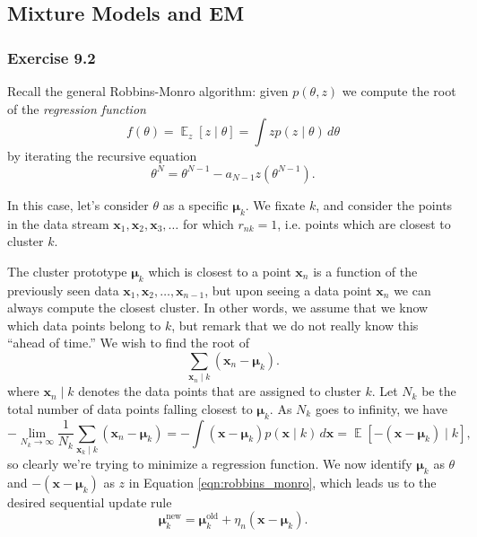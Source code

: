 \documentclass[12pt, a4paper]{article}
\newcommand{\vect}[1]{\bm{#1}}
\DeclareMathOperator{\E}{\mathbb{E}}
\begin{document}
\subsection{Mixture Models and EM}

\subsubsection*{Exercise 9.2}
Recall the general Robbins-Monro algorithm:
given $p(\theta, z)$ we compute the root of
the \emph{regression function}
\begin{equation*}
	f(\theta) = \E_z \left[ z \mid \theta \right]
	= \int z p (z \mid \theta) \, d\theta
\end{equation*}
by iterating the recursive equation
\begin{equation}
\label{eqn:robbins_monro}
	\theta^{N} = \theta^{N-1} - a_{N-1} z \left( \theta^{N-1} \right).
\end{equation}

In this case, let's consider $\theta$ as a specific $\vect{\mu}_k$.
We fixate $k$, and consider the points in the data stream $\vect{x}_1, \vect{x}_2, \vect{x}_3, \ldots$ for which $r_{nk} = 1$, i.e. points which are closest to cluster $k$.

The cluster prototype $\vect{\mu}_k$ which is closest to a point $\vect{x}_n$  is a function of the previously seen data $\vect{x}_1, \vect{x}_2, \ldots, \vect{x}_{n-1}$, but upon seeing a data point $\vect{x}_n$ we can always compute the closest cluster.
In other words, we assume that we know which data points belong to $k$, but remark that we do not really know this ``ahead of time.''
We wish to find the root of
\begin{equation*}
	\sum_{\vect{x}_n \mid k} \left( \vect{x}_n - \vect{\mu}_k \right).
\end{equation*}
where $\vect{x}_n \mid k$ denotes the data points that are assigned to cluster $k$.
Let $N_k$ be the total number of data points falling closest to $\vect{\mu}_k$.
As $N_k$ goes to infinity, we have
\begin{equation*}
	- \lim_{N_k \to \infty} \frac{1}{N_k} \sum_{\vect{x}_k \mid k} \left( \vect{x}_n - \vect{\mu}_k \right)
	= - \int 
	\left( \vect{x} - \vect{\mu}_k \right) p(\vect{x} \mid k) \, d \vect{x}
	= \E \left[ - \left( \vect{x} - \vect{\mu}_k \right) \mid k \right],
\end{equation*}
so clearly we're trying to minimize a regression function.
We now identify $\vect{\mu}_k$ as $\theta$ and $-\left( \vect{x} - \vect{\mu}_k \right)$ as $z$ in Equation \eqref{eqn:robbins_monro}, which leads us to the desired sequential update rule
\begin{equation*}
	\vect{\mu}_k^{\text{new}} = 
	\vect{\mu}_k^{\text{old}} 
	+ \eta_n \left( \vect{x} - \vect{\mu}_k \right).
\end{equation*}
\end{document}
